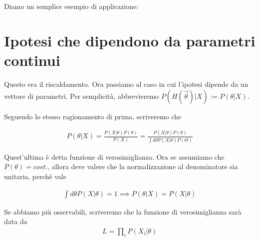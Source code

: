 \documentclass{report}
\begin{document}
Diamo un semplice esempio di applicazione: 



\section{Ipotesi che dipendono da parametri continui}
Questo era il riscaldamento. Ora passiamo al caso in cui l'ipotesi dipende da un vettore di parametri. Per semplicità, abbrevieremo \(P(H(\vec{\theta})|X) := P(\theta | X)\). 

Seguendo lo stesso ragionamento di prima, scriveremo che 

\begin{align}
    P(\theta | X) = \frac{P(X|\theta)P(\theta)}{P(X)} = \frac{P(X|\theta)P(\theta)}{\int d\theta P(X|\theta)P(\Theta)}
\end{align}

Quest'ultima è detta funzione di verosimiglianza. Ora se assumiamo che \(P(\theta) = cost. \), allora deve valere che la normalizzazione al denominatore sia unitaria, perché vale 


\begin{align}
    \int d\theta P(X|\theta) = 1  \implies P(\theta | X) = P(X| \theta)
\end{align}

Se abbiamo più osservabili, scriveremo che la funzione di verosimiglianza sarà data da 
\begin{align}
    L = \prod_i P(X_i | \theta)
\end{align}
\end{document}

